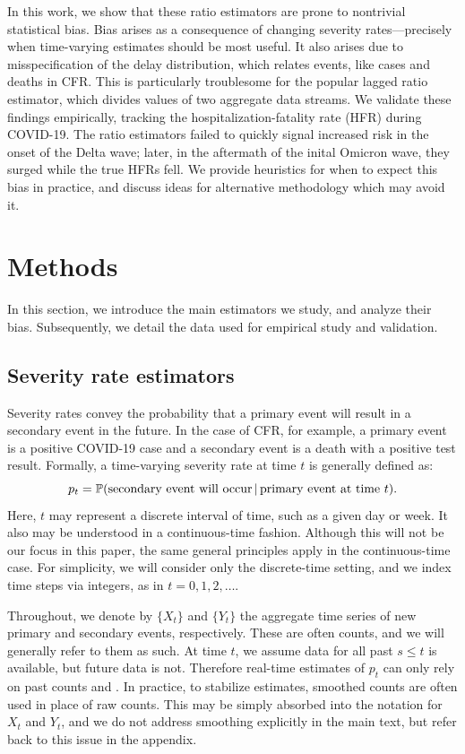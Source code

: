 \documentclass{article}
\newcommand{\given}{\, \vert \,}
\begin{document}
In this work, we show that these ratio estimators are prone to nontrivial
statistical bias. Bias arises as a consequence of changing severity
rates---precisely when time-varying estimates should be most useful. It also 
arises due to misspecification of the delay distribution, which relates events, 
like cases and deaths in CFR. This is particularly troublesome for the popular
lagged ratio estimator, which divides values of two aggregate data streams. We
validate these findings empirically, tracking the hospitalization-fatality rate
(HFR) during COVID-19. The ratio estimators failed to quickly signal increased
risk in the onset of the Delta wave; later, in the aftermath of the inital
Omicron wave, they surged while the true HFRs fell. We provide heuristics for
when to expect this bias in practice, and discuss ideas for alternative
methodology which may avoid it. 

\section{Methods}
\label{sec:methods}

In this section, we introduce the main estimators we study, and analyze their 
bias. Subsequently, we detail the data used for empirical study and validation. 

\subsection{Severity rate estimators}
\label{sec:defs}

Severity rates convey the probability that a primary event will result in a
secondary event in the future. In the case of CFR, for example, a primary event
is a positive COVID-19 case and a secondary event is a death with a positive
test result. Formally, a time-varying severity rate at time $t$ is generally
defined as:  
\begin{equation}
\label{eq:severity}
p_t = \P(\text{secondary event will occur} \given \text{primary event at time 
  $t$}).   
\end{equation}
Here, $t$ may represent a discrete interval of time, such as a given day or 
week. It also may be understood in a continuous-time fashion. Although this will    
not be our focus in this paper, the same general principles apply in the
continuous-time case. For simplicity, we will consider only the discrete-time 
setting, and we index time steps via integers, as in $t=0,1,2,\dots$.    

Throughout, we denote by $\{X_t\}$ and $\{Y_t\}$ the aggregate time series of 
new primary and secondary events, respectively. These are often counts, and we
will generally refer to them as such. At time $t$, we assume data for all past
$s \leq t$ is available, but future data is not. Therefore real-time estimates of
$p_t$ can only rely on past counts  and
. In practice, to stabilize estimates, smoothed
counts are often used in place of raw counts. This may be simply absorbed into 
the notation for $X_t$ and $Y_t$, and we do not address smoothing explicitly in
the main text, but refer back to this issue in the appendix.
\end{document}
